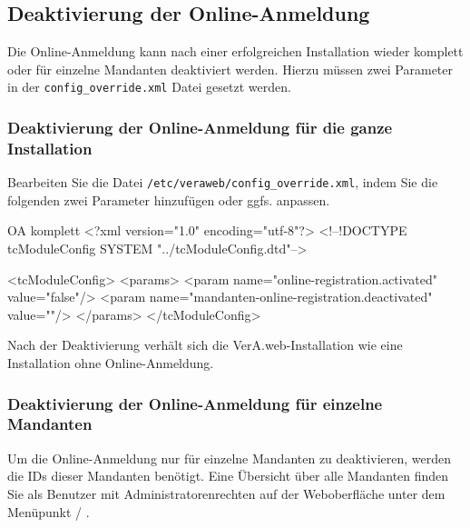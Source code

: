\subsection{Deaktivierung der Online-Anmeldung}\label{sec:deactivate-oa}

Die Online-Anmeldung kann nach einer erfolgreichen Installation
wieder komplett oder für einzelne Mandanten deaktiviert werden.
Hierzu müssen zwei Parameter in der \texttt{config\_override.xml}
Datei gesetzt werden.

\subsubsection{Deaktivierung der Online-Anmeldung für die ganze Installation}

\begin{minipage}{\linewidth}
Bearbeiten Sie die Datei \texttt{/etc/veraweb/config\_override.xml},
indem Sie die folgenden zwei Parameter hinzufügen oder ggfs. anpassen.

\begin{lstdump}[language=XML]{OA komplett}
<?xml version="1.0" encoding="utf-8"?>
<!--!DOCTYPE tcModuleConfig SYSTEM "../tcModuleConfig.dtd"-->

<tcModuleConfig>
    <params>
        <param name="online-registration.activated" value="false"/>
        <param name="mandanten-online-registration.deactivated" value=""/>
    </params>
</tcModuleConfig>
\end{lstdump}
\end{minipage}

Nach der Deaktivierung verhält sich die VerA.web-Installation wie eine
Installation ohne Online-Anmeldung.

\subsubsection{Deaktivierung der Online-Anmeldung für einzelne Mandanten}

Um die Online-Anmeldung nur für einzelne Mandanten zu deaktivieren,
werden die IDs dieser Mandanten benötigt. Eine Übersicht über alle
Mandanten finden Sie als Benutzer mit Administratorenrechten auf der
Weboberfläche unter dem Menüpunkt  /
.

